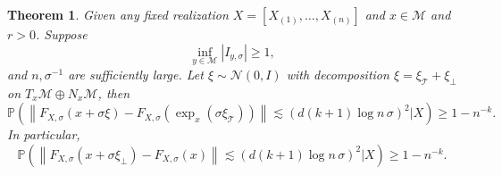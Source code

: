 \documentclass{article}
\newtheorem{thm}[theorem]{Theorem}
\def\calM{\mathcal{M}}
\begin{document}


\begin{thm}
\label{thm:NWproj}
Given any fixed realization $X=[X_{(1)},\ldots,X_{(n)}]$ and $x\in \calM$ and $r>0$. Suppose 
\[
\inf_{y\in\calM}|I_{y,\sigma}|\geq  1, 
\]
and $n,\sigma^{-1}$ are sufficiently large.
Let $\xi\sim \mathcal{N}(0,I)$ with decomposition $\xi=\xi_{\mathcal{T}}+\xi_\bot$ on $T_x\calM\oplus N_x\calM$, then 
\[
\mathbb{P}\left( \left\| F_{X,\sigma}(x + \sigma \xi) - F_{X,\sigma}(\exp_x(\sigma \xi_{\mathcal{T}}))\right\| \lesssim (d(k+1)\log n\, \sigma)^2|X \right) \ge 1 - n^{-k}. 
\]
In particular, 
\[
\mathbb{P}\left( \left\| F_{X,\sigma}(x + \sigma \xi_\bot) - F_{X,\sigma}(x)\right\| \lesssim (d(k+1)\log n\, \sigma)^2|X \right) \ge 1 - n^{-k}. 
\]
\end{thm}
\end{document}
